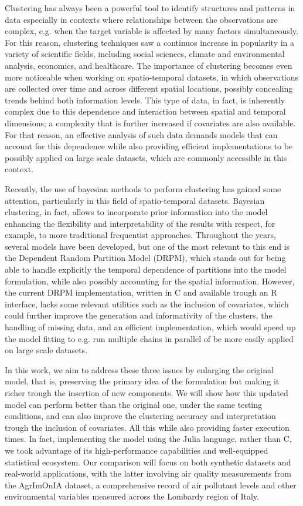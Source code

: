 \documentclass[12pt,	%
	a4paper,		%
	twoside,		%
	openright,		%
	titlepage,%
	]{book}
\theoremstyle{definition}
\begin{document}
Clustering has always been a powerful tool to identify structures and patterns in data especially in contexts where relationships between the observations are complex, e.g. when the target variable is affected by many factors simultaneously. For this reason, clustering techniques saw a continuos increase in popularity in a variety of scientific fields, including social sciences, climate and environmental analysis, economics, and healthcare. The importance of clustering becomes even more noticeable when working on spatio-temporal datasets, in which observations are collected over time and across different spatial locations, possibly concealing trends behind both information levels. This type of data, in fact, is inherently complex due to this dependence and interaction between spatial and temporal dimensions; a complexity that is further increased if covariates are also available. For that reason, an effective analysis of such data demands models that can account for this dependence while also providing efficient implementations to be possibly applied on large scale datasets, which are commonly accessible in this context.

Recently, the use of bayesian methods to perform clustering has gained some attention, particularly in this field of spatio-temporal datasets. Bayesian clustering, in fact, allows to incorporate prior information into the model enhancing the flexibility and interpretability of the results with respect, for example, to more traditional frequentist approaches. Throughout the years, several models have been developed, but one of the most relevant to this end is the Dependent Random Partition Model (DRPM), which stands out for being able to handle explicitly the temporal dependence of partitions into the model formulation, while also possibly accounting for the spatial information. However, the current DRPM implementation, written in C and available trough an R interface, lacks some relevant utilities such as the inclusion of covariates, which could further improve the generation and informativity of the clusters, the handling of missing data, and an efficient implementation, which would speed up the model fitting to e.g. run multiple chains in parallel of be more easily applied on large scale datasets.

In this work, we aim to address these three issues by enlarging the original model, that is, preserving the primary idea of the formulation but making it richer trough the insertion of new components. We will show how this updated model can perform better than the original one, under the same testing conditions, and can also improve the clustering accuracy and interpretation trough the inclusion of covariates. All this while also providing faster execution times. In fact, implementing the model using the Julia language, rather than C, we took advantage of its high-performance capabilities and well-equipped statistical ecosystem. Our comparison will focus on both synthetic datasets and real-world applications, with the latter involving air quality measurements from the AgrImOnIA dataset, a comprehensive record of air pollutant levels and other environmental variables measured across the Lombardy region of Italy.
\end{document}
